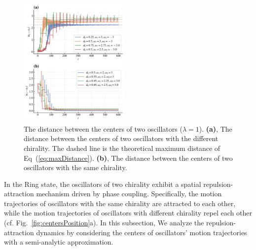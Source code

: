 \documentclass[%
 aip,
 amsmath,amssymb,
 reprint,%
]{revtex4-1}
\begin{document}
\begin{figure}[b]
    \includegraphics[width=0.48\textwidth]{./figs/2OsCenterDistance.pdf}
    \caption{
        \label{fig:2OsCenterDistance} The distance between the centers of two oscillators ($\lambda=1$). 
        \textbf{(a)}, The distance between the centers of two oscillators with the different chirality. The dashed line is the theoretical maximum distance of Eq~(\ref{eq:maxDistance}).
        \textbf{(b)}, The distance between the centers of two oscillators with the same chirality.
    }
\end{figure}

In the Ring state, the oscillators of two chirality exhibit a spatial repulsion-attraction mechanism driven by phase coupling. Specifically, the motion trajectories of oscillators with the same chirality are attracted to each other, while the motion trajectories of oscillators with different chirality repel each other (cf. Fig.~\ref{fig:centersPosition}a). 
In this subsection, We analyze the repulsion-attraction dynamics by considering the centers of oscillators' motion trajectories with a semi-analytic approximation.
\end{document}
